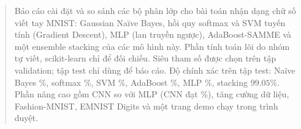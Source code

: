 \begin{abstract}
\noindent Báo cáo cài đặt và so sánh các bộ phân lớp cho bài toán nhận dạng chữ số viết tay MNIST: Gaussian Naïve Bayes, hồi quy softmax và SVM tuyến tính (Gradient Descent), MLP (lan truyền ngược), AdaBoost-SAMME và một ensemble stacking của các mô hình này. Phần tính toán lõi do nhóm tự viết, scikit-learn chỉ để đối chiếu. Siêu tham số được chọn trên tập validation; tập test chỉ dùng để báo cáo. Độ chính xác trên tập test: Naïve Bayes \accTestNB\%, softmax \accTestSM\%, SVM \svmTest\%, AdaBoost \accTestADA\%, MLP \accTestMLP\%, stacking $99.05\%$. Phần nâng cao gồm CNN so với MLP (CNN đạt \accTestCNN\%), tăng cường dữ liệu, Fashion-MNIST, EMNIST Digits và một trang demo chạy trong trình duyệt.
\end{abstract}
